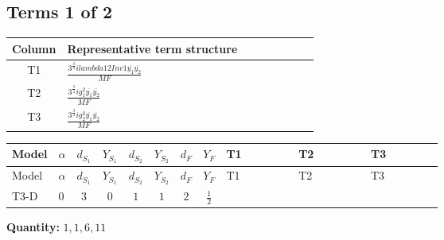 \documentclass[8pt]{article}
\begin{document}
\begin{landscape}
\subsection*{Terms 1 of 2}
\begin{center}
\begin{tabular}{@{}c >{\raggedright\arraybackslash}p{0.82\linewidth}@{}}
\toprule
Column & Representative term structure \\
\midrule
T1 & \(\displaystyle \frac{3^{\frac{3}{4}} i lambda12Inv1 \overline{y_{1}} \overline{y_{2}}}{MF}\) \\
\midrule
T2 & \(\displaystyle \frac{3^{\frac{3}{4}} i g_{1}^{2} \overline{y_{1}} \overline{y_{2}}}{MF}\) \\
\midrule
T3 & \(\displaystyle \frac{3^{\frac{3}{4}} i g_{2}^{2} \overline{y_{1}} \overline{y_{2}}}{MF}\) \\
\midrule
\bottomrule
\end{tabular}
\end{center}
\smallskip
\tiny
\begin{longtable}{@{}llcccccc >{\raggedright\arraybackslash}p{0.21\linewidth} >{\raggedright\arraybackslash}p{0.21\linewidth} >{\raggedright\arraybackslash}p{0.21\linewidth}@{}}
\toprule
Model & $\alpha$ & $d_{S_1}$ & $Y_{S_1}$ & $d_{S_2}$ & $Y_{S_2}$ & $d_F$ & $Y_F$ & T1 & T2 & T3 \\
\midrule
\endfirsthead
\toprule
Model & $\alpha$ & $d_{S_1}$ & $Y_{S_1}$ & $d_{S_2}$ & $Y_{S_2}$ & $d_F$ & $Y_F$ & T1 & T2 & T3 \\
\midrule
\endhead
T3-D & $0$ & $3$ & $0$ & $1$ & $1$ & $2$ & $\frac{1}{2}$ & \scriptsize\adjustbox{max width=\linewidth}{$\begin{gathered} \frac{3^{\frac{3}{4}} i lambda12Inv1 \overline{y_{1}} \overline{y_{2}}}{6 MF}\end{gathered}$} & \scriptsize\adjustbox{max width=\linewidth}{$\begin{gathered} \frac{3^{\frac{3}{4}} i g_{1}^{2} \overline{y_{1}} \overline{y_{2}}}{8 MF}\end{gathered}$} & \scriptsize\adjustbox{max width=\linewidth}{$\begin{gathered} \frac{17 \cdot 3^{\frac{3}{4}} i g_{2}^{2} \overline{y_{1}} \overline{y_{2}}}{24 MF}\end{gathered}$} \\
\midrule
\bottomrule
\end{longtable}
\clearpage
\noindent\textbf{Quantity: }$\mathrm{1,1,6,11}$\par\smallskip

\end{landscape}
\end{document}
